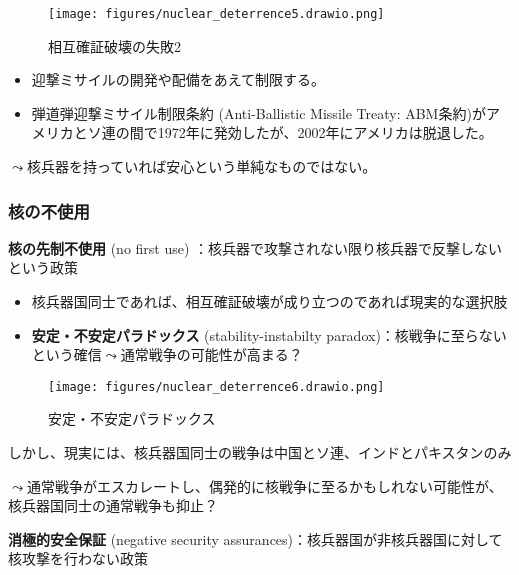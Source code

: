 \documentclass[
  xelatex,
  ja=standard]{bxjsarticle}
\providecommand{\tightlist}{%
  \setlength{\itemsep}{0pt}\setlength{\parskip}{0pt}}\usepackage{longtable,booktabs,array}
\begin{document}
\begin{figure}[htpb]

{\centering \texttt{[image: figures/nuclear\_deterrence5.drawio.png]}

}

\caption{相互確証破壊の失敗2}

\end{figure}

\begin{itemize}
\tightlist
\item
  迎撃ミサイルの開発や配備をあえて制限する。
\item
  弾道弾迎撃ミサイル制限条約 (Anti-Ballistic Missile Treaty:
  ABM条約)がアメリカとソ連の間で1972年に発効したが、2002年にアメリカは脱退した。
\end{itemize}

\(\leadsto\)核兵器を持っていれば安心という単純なものではない。

\hypertarget{ux6838ux306eux4e0dux4f7fux7528}{%
\subsubsection{核の不使用}\label{ux6838ux306eux4e0dux4f7fux7528}}

\textbf{核の先制不使用} (no first use)
：核兵器で攻撃されない限り核兵器で反撃しないという政策

\begin{itemize}
\tightlist
\item
  核兵器国同士であれば、相互確証破壊が成り立つのであれば現実的な選択肢
\item
  \textbf{安定・不安定パラドックス} (stability-instabilty
  paradox)：核戦争に至らないという確信\(\leadsto\)通常戦争の可能性が高まる？\citep{jervis1979}
\end{itemize}

\begin{figure}[htpb]

{\centering \texttt{[image: figures/nuclear\_deterrence6.drawio.png]}

}

\caption{安定・不安定パラドックス}

\end{figure}

しかし、現実には、核兵器国同士の戦争は中国とソ連、インドとパキスタンのみ

\(\leadsto\)通常戦争がエスカレートし、偶発的に核戦争に至るかもしれない可能性が、核兵器国同士の通常戦争も抑止？

\textbf{消極的安全保証} (negative security
assurances)：核兵器国が非核兵器国に対して核攻撃を行わない政策
\end{document}
